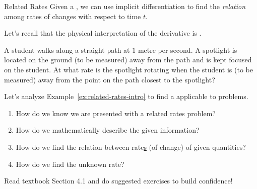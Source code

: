 \documentclass[../main.tex]{subfiles}
\begin{document}
\begin{lesson}{Related Rates}
  Given a , we can use implicit differentiation  to find the \emph{relation} among rates of changes with respect to time \(t\).

  Let's recall that the physical interpretation of the derivative is .
  \begin{example} \label{ex:related-rates-intro}
    A student walks along a straight path at \(1\) metre per second.  A spotlight is located on the ground (to be measured) \underline{\hspace{1in}} away from the path and is kept focused on the student. At what rate is the spotlight rotating when the student is (to be measured) \underline{\hspace{1in}} away from the point on the path closest to the spotlight?
  \end{example}

  \clearpage

  Let's analyze Example~\ref{ex:related-rates-intro} to find a  applicable to   problems. 
  \begin{enumerate}
    \item How do we know we are presented with a related rates problem?

    \item How do we mathematically describe the given information?

    \item How do we find the relation between rate\underline{s} (of change) of given quantities?

    \item How do we find the unknown rate?
  \end{enumerate}

  \faStar{} Read textbook Section 4.1 and do suggested exercises to build confidence!


\end{lesson}
\end{document}
